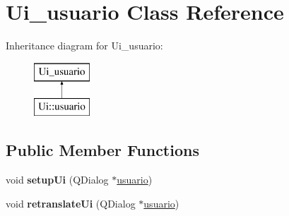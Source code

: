 \hypertarget{class_ui__usuario}{}\section{Ui\+\_\+usuario Class Reference}
\label{class_ui__usuario}
Inheritance diagram for Ui\+\_\+usuario\+:\begin{figure}[H]
\begin{center}
\leavevmode
\includegraphics[height=2.000000cm]{class_ui__usuario}
\end{center}
\end{figure}
\subsection*{Public Member Functions}
\begin{DoxyCompactItemize}
\item 
\mbox{\label{class_ui__usuario_a48c30dd275c61494b7892a0f1e95d675}} 
void {\bfseries setup\+Ui} (Q\+Dialog $\ast$\hyperlink{classusuario}{usuario})
\item 
\mbox{\label{class_ui__usuario_a483718ca4dcb29af2e969a76ca3afee4}} 
void {\bfseries retranslate\+Ui} (Q\+Dialog $\ast$\hyperlink{classusuario}{usuario})
\end{DoxyCompactItemize}
